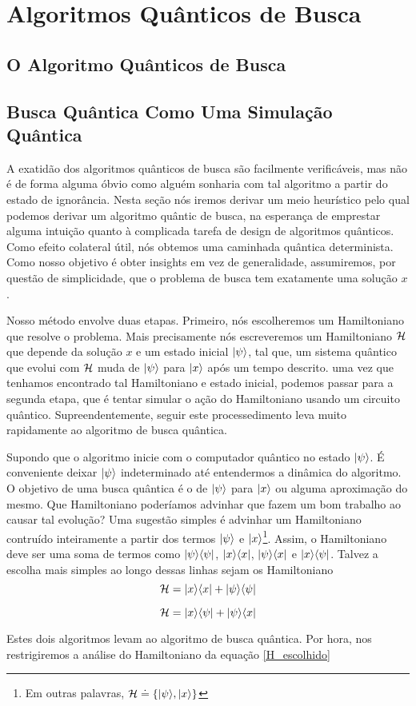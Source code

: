 \chapter{Algoritmos Quânticos de Busca}

\section{O Algoritmo Quânticos de Busca}

\section{Busca Quântica Como Uma Simulação Quântica}

A exatidão dos algoritmos quânticos de busca são facilmente verificáveis, mas não é de forma alguma óbvio como alguém sonharia com tal algoritmo a partir do estado de ignorância. Nesta seção nós iremos derivar um meio heurístico pelo qual podemos derivar um algoritmo quântic de busca, na esperança de emprestar alguma intuição quanto à complicada tarefa de design de algoritmos quânticos. Como efeito colateral útil, nós obtemos uma caminhada quântica determinista. Como nosso objetivo é obter insights em vez de generalidade, assumiremos, por questão de simplicidade, que o problema de busca tem exatamente uma solução $x$.

Nosso método envolve duas etapas. Primeiro, nós escolheremos um Hamiltoniano que resolve o problema. Mais precisamente nós escreveremos um Hamiltoniano $\mathcal{H}$ que depende da solução $x$ e um estado inicial $\vert \psi \rangle$, tal que, um sistema quântico que evolui com $\mathcal{H}$ muda de $\vert \psi \rangle$ para $\vert x \rangle$ após um tempo descrito. uma vez que tenhamos encontrado tal Hamiltoniano e estado inicial, podemos passar para a segunda etapa, que é tentar simular o ação do Hamiltoniano usando um circuito quântico. Supreendentemente, seguir este processedimento leva muito rapidamente ao algoritmo de busca quântica.

Supondo que o algoritmo inicie com o computador quântico no estado $\vert \psi \rangle$. É conveniente deixar $\vert \psi \rangle$ indeterminado até entendermos a dinâmica do algoritmo. O objetivo de uma busca quântica é o de $\vert \psi \rangle$ para $\vert x \rangle$ ou alguma aproximação do mesmo. Que Hamiltoniano poderíamos advinhar que fazem um bom trabalho ao causar tal evolução? Uma sugestão simples é advinhar um Hamiltoniano contruído inteiramente a partir dos termos $\vert \psi \rangle$ e $\vert x \rangle$\footnote{Em outras palavras, $\mathcal{H} \doteq \left\{\vert \psi \rangle, \vert x \rangle\right\} $}. Assim, o Hamiltoniano deve ser uma soma de termos como $\vert \psi \rangle\langle \psi \vert$, $\vert x \rangle\langle x \vert$, $\vert \psi \rangle\langle x \vert$ e $\vert x \rangle\langle \psi \vert$. Talvez a escolha mais simples ao longo dessas linhas sejam os Hamiltoniano
\begin{equation}
    \mathcal{H} = \vert x \rangle\langle x \vert + \vert \psi \rangle\langle \psi \vert
    \label{H_escolhido}
\end{equation}

\begin{equation}
    \mathcal{H} = \vert x \rangle\langle \psi \vert + \vert \psi \rangle\langle x \vert
\end{equation}

Estes dois algoritmos levam ao algoritmo de busca quântica. Por hora, nos restrigiremos a análise do Hamiltoniano da equação \ref{H_escolhido}